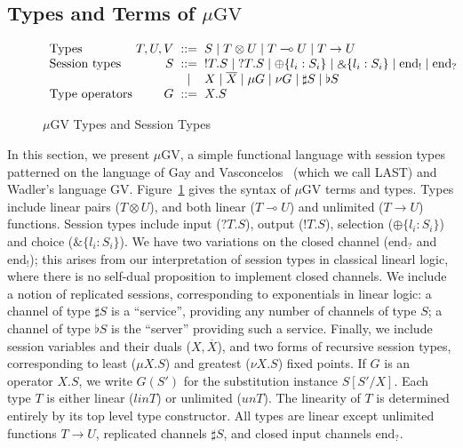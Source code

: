 \documentclass[orivec,envcountsame]{llncs}
\newcommand{\with}{\mathbin\binampersand}
\newcommand{\gvdual}[1]{\overline{#1}}
\newcommand{\gvout}[2]{{!#1.#2}}
\newcommand{\gvin}[2]{{?#1.#2}}
\newcommand{\lto}{\ensuremath{\multimap}}
\newcommand{\uto}{\ensuremath{\rightarrow}}
\newcommand{\outterm}{\mathrm{end}_!}
\newcommand{\interm}{\mathrm{end}_?}
\newcommand{\gvserver}[1]{\flat #1}
\newcommand{\gvservice}[1]{\sharp #1}
\newcommand{\mkwd}[1]{\mathsf{#1}}
\newcommand{\gvsend}[2]{\mkwd{send}\:#1\:#2}
\newcommand{\gvreceive}[1]{\mkwd{receive}\:#1}
\newcommand{\gvlet}[3]{\mkwd{let}\;#1 = #2\;\mkwd{in}\;#3}
\newcommand{\gvselect}[2]{\mkwd{select}\:#1\:#2}
\newcommand{\gvcase}[2]{\mkwd{case}\:#1\:\{#2\}}
\newcommand{\gvlink}[2]{\mkwd{link}\:#1\:#2}
\newcommand{\gvfork}[2]{\mkwd{fork}\:#1.#2}
\newcommand{\lrkwd}{\mkwd{fix}}
\newcommand{\gvfix}[3]{\lrkwd\:#1\:#2 = #3}
\newcommand{\gvletrec}[4]{\gvlet{#1}{\gvfix{#1}{#2}{#3}}{#4}}
\newcommand{\un}{un}
\newcommand{\lin}{lin}
\newcommand{\mugv}{$\mu\mathrm{GV}$\xspace}
\begin{document}
\subsection{Types and Terms of \mugv}\label{sec:mugv-syntax}

\begin{figure}\small
\[\begin{array}{l@{\hspace{1mm}}r@{\hspace{2mm}}c@{\hspace{2mm}}l}
  \text{Types} & T,U,V & ::= & S \mid T \otimes U \mid T \lto U \mid T \uto U \\
  \text{Session types} & S & ::= & \gvout{T}{S} \mid \gvin{T}{S} \mid \oplus \{ l_i : S_i \} \mid \with \{ l_i : S_i \} \mid \outterm \mid \interm \\
   & & \mid & X \mid \gvdual{X} \mid \mu G \mid \nu G \mid \gvservice{S} \mid \gvserver{S} \\
  \text{Type operators} & G & ::= & X.S %
\end{array}\]
\caption{\mugv Types and Session Types}\label{fig:gv-syntax}
\end{figure}

In this section, we present \mugv, a simple functional language with session types patterned on the
language of Gay and Vasconcelos~\cite{GayVasconcelos10} (which we call LAST) and Wadler's language
GV. Figure~\ref{fig:gv-syntax} gives the syntax of \mugv terms and types. Types include linear pairs
($T \otimes U$), and both linear ($T \lto U$) and unlimited ($T \uto U$) functions. Session types
include input ($\gvin{T}{S}$), output ($\gvout{T}{S}$), selection ($\oplus\{ l_i:S_i \}$) and choice
($\with\{l_i:S_i\}$). We have two variations on the closed channel ($\interm$ and $\outterm$); this
arises from our interpretation of session types in classical linearl logic, where there is no
self-dual proposition to implement closed channels. We include a notion of replicated sessions,
corresponding to exponentials in linear logic: a channel of type $\gvservice{S}$ is a ``service'',
providing any number of channels of type $S$; a channel of type $\gvserver{S}$ is the ``server''
providing such a service. Finally, we include session variables and their duals ($X,\gvdual{X}$),
and two forms of recursive session types, corresponding to least ($\mu X.S$) and greatest ($\nu
X.S$) fixed points. If $G$ is an operator $X.S$, we write $G(S')$ for the substitution instance
$S[S'/X]$.
%
Each type $T$ is either linear ($\lin{T}$) or unlimited ($\un{T}$). The linearity of $T$ is
determined entirely by its top level type constructor.
%
All types are linear except unlimited functions $T \uto U$, replicated channels $\gvservice{S}$, and
closed input channels $\interm$.
\end{document}
